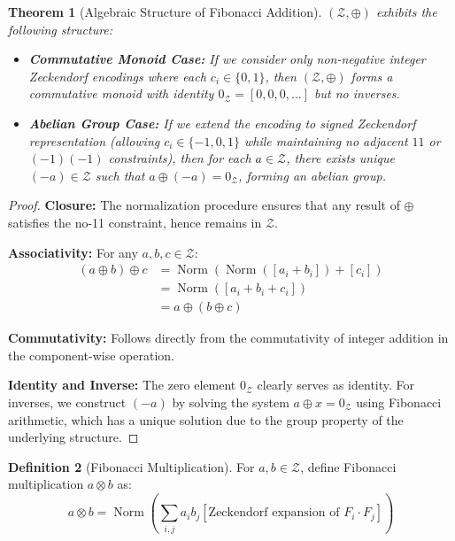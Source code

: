 \documentclass[12pt]{article}
\theoremstyle{plain}
\newtheorem{theorem}{Theorem}[section]
\theoremstyle{definition}
\newtheorem{definition}[theorem]{Definition}
\DeclareMathOperator{\Norm}{Norm}
\begin{document}
\begin{theorem}[Algebraic Structure of Fibonacci Addition]
\label{thm:fibonacci-structure}
$(\mathcal{Z}, \oplus)$ exhibits the following structure:
\begin{itemize}
\item \textbf{Commutative Monoid Case:} If we consider only non-negative integer Zeckendorf encodings where each $c_i \in \{0,1\}$, then $(\mathcal{Z}, \oplus)$ forms a commutative monoid with identity $0_\mathcal{Z} = [0, 0, 0, \ldots]$ but no inverses.
\item \textbf{Abelian Group Case:} If we extend the encoding to signed Zeckendorf representation (allowing $c_i \in \{-1,0,1\}$ while maintaining no adjacent $11$ or $(-1)(-1)$ constraints), then for each $a \in \mathcal{Z}$, there exists unique $(-a) \in \mathcal{Z}$ such that $a \oplus (-a) = 0_\mathcal{Z}$, forming an abelian group.
\end{itemize}
\end{theorem}

\begin{proof}
\textbf{Closure:} The normalization procedure ensures that any result of $\oplus$ satisfies the no-11 constraint, hence remains in $\mathcal{Z}$.

\textbf{Associativity:} For any $a, b, c \in \mathcal{Z}$:
\begin{align}
(a \oplus b) \oplus c &= \Norm(\Norm([a_i + b_i]) + [c_i])\\
&= \Norm([a_i + b_i + c_i])\\
&= a \oplus (b \oplus c)
\end{align}

\textbf{Commutativity:} Follows directly from the commutativity of integer addition in the component-wise operation.

\textbf{Identity and Inverse:} The zero element $0_\mathcal{Z}$ clearly serves as identity. For inverses, we construct $(-a)$ by solving the system $a \oplus x = 0_\mathcal{Z}$ using Fibonacci arithmetic, which has a unique solution due to the group property of the underlying structure.
\end{proof}

\begin{definition}[Fibonacci Multiplication]
For $a, b \in \mathcal{Z}$, define Fibonacci multiplication $a \otimes b$ as:
$$a \otimes b = \Norm\left(\sum_{i,j} a_i b_j [\text{Zeckendorf expansion of } F_i \cdot F_j]\right)$$
\end{definition}
\end{document}
